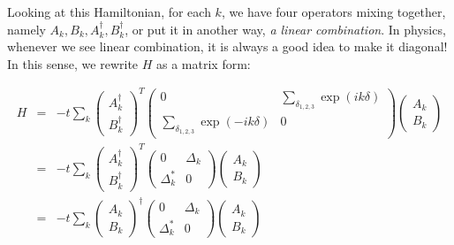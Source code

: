 \documentclass{article}
\begin{document}
Looking at this Hamiltonian, for each $k$, we have four operators mixing together, namely $A_k, B_k, A^{\dag}_k, B^{\dag}_k$, or put it in another way, \textit{a linear combination}. In physics, whenever we see linear combination, it is always a good idea to make it diagonal! In this sense, we rewrite $H$ as a matrix form:

\begin{eqnarray*}  H & = & - t \underset{k}{\sum} \left(\begin{array}{c}    A^{\dag}_k\\    B_k^{\dag}  \end{array}\right)^T \left(\begin{array}{cc}    0 & \underset{\delta_{1, 2, 3}}{\sum} \exp (i k \delta)\\    \underset{\delta_{1, 2, 3}}{\sum} \exp (- i k \delta) & 0  \end{array}\right) \left(\begin{array}{c}    A_k\\    B_k  \end{array}\right)\\  & = & - t \underset{k}{\sum} \left(\begin{array}{c}    A^{\dag}_k\\    B_k^{\dag}  \end{array}\right)^T \left(\begin{array}{cc}    0 & \Delta_k\\    \Delta^{\ast}_k & 0  \end{array}\right) \left(\begin{array}{c}    A_k\\    B_k  \end{array}\right)\\  & = & - t \underset{k}{\sum} \left(\begin{array}{c}    A_k\\    B_k  \end{array}\right)^{\dag} \left(\begin{array}{cc}    0 & \Delta_k\\    \Delta^{\ast}_k & 0  \end{array}\right) \left(\begin{array}{c}    A_k\\    B_k  \end{array}\right)\end{eqnarray*}
\end{document}
